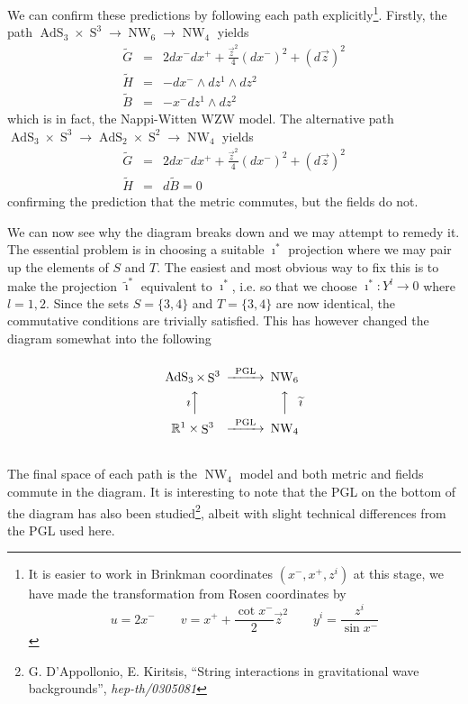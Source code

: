 \documentclass[14pt, a4paper, titlepage]{slides}
\DeclareMathOperator{\AdS}{AdS}
\DeclareMathOperator{\Sphere}{S}
\DeclareMathOperator{\NW}{NW}
\let\S\Sphere
\begin{document}
We can confirm these predictions by following each path explicitly\footnote{It
  is easier to work in Brinkman coordinates $(x^-,x^+,z^i)$ at this stage, we
  have made the transformation from Rosen coordinates by
  \begin{equation}
    \label{eq:ex:jose:brinkman}
    u=2x^- \qquad v=x^+ + \frac{\cot{x^-}}{2}\vec{z}^2 \qquad y^i=\frac{z^i}{\sin{x^-}}
  \end{equation}}. Firstly, the path
$\AdS_3\times\S^3\rightarrow\NW_6\rightarrow\NW_4$ yields
\begin{eqnarray*}
  \widetilde{G}&=&2dx^-dx^+ +\frac{\vec{z}^2}{4}\left(d
    x^-\right)^2 + \left(d\vec{z}\right)^2 \\
  \widetilde{H}&=&-dx^-\wedge dz^1\wedge dz^2 \\
  \widetilde{B}&=&-x^- dz^1\wedge dz^2
\end{eqnarray*}
which is in fact, the Nappi-Witten WZW model. The alternative path
$\AdS_3\times\S^3\rightarrow\AdS_2\times\S^2\rightarrow\NW_4$ yields
\begin{eqnarray*}
  \widetilde{G}&=&2dx^-dx^+ +\frac{\vec{z}^2}{4}\left(d
    x^-\right)^2 + \left(d\vec{z}\right)^2 \\
  \widetilde{H}&=&d\widetilde{B}=0
\end{eqnarray*}
confirming the prediction that the metric commutes, but the fields do not.

We can now see why the diagram breaks down and we may attempt to remedy it. The
essential problem is in choosing a suitable $\imath^*$ projection where we may
pair up the elements of $S$ and $T$. The easiest and most obvious way to fix
this is to make the projection $\widetilde{\imath}^*$ equivalent to $\imath^*$,
i.e. so that we choose $\imath^*: Y^l\rightarrow 0$ where $l=1,2$. Since the
sets $S=\{3,4\}$ and $T=\{3,4\}$ are now identical, the commutative conditions
are trivially satisfied. This has however changed the diagram somewhat into the
following
\begin{equation*}
  \begin{CD}
    @.\\
    \AdS_3 \times \S^3             @>\text{PGL}>> \NW_6\\
    \text{$\imath$}@AAA @AAA\text{$\widetilde{\imath}$}\\
    \mathbb{R}^1\times\S^3         @>\text{PGL}>> \NW_4\\
    @.
  \end{CD}
\end{equation*}
The final space of each path is the $\NW_4$ model and both metric and fields
commute in the diagram. It is interesting to note that the PGL on the bottom of
the diagram has also been studied\footnote{G. D'Appollonio, E. Kiritsis,
  ``String interactions in gravitational wave backgrounds'',
  \textit{hep-th/0305081}}, albeit with slight technical differences from the
PGL used here.
\end{document}
